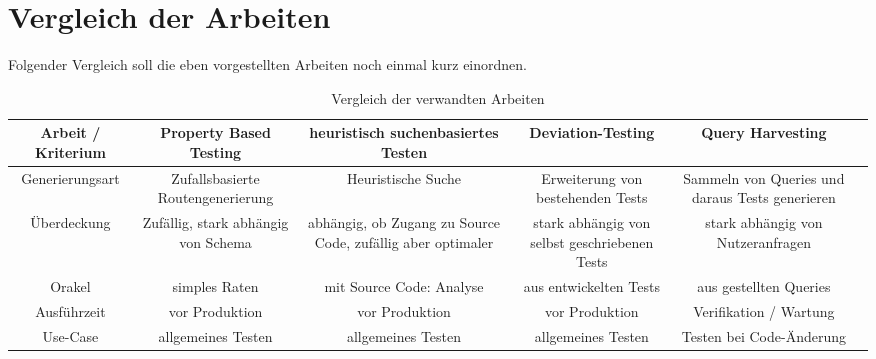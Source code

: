 \section{Vergleich der Arbeiten}
Folgender Vergleich soll die eben vorgestellten Arbeiten noch einmal kurz einordnen.
\begin{center}
    \begin{table}[!hbt]
        \begin{tabularx}{\textwidth}{|C|C|C|C|C|C|}
            \hline
            \textbf{ Arbeit / Kriterium} & \textbf{Property Based Testing} & \textbf{heuristisch suchenbasiertes Testen} & \textbf{Deviation-Testing} & \textbf{Query Harvesting} \\
            \hline
            Generierungsart & Zufallsbasierte Routengenerierung & Heuristische Suche & Erweiterung von bestehenden Tests & Sammeln von Queries und daraus Tests generieren \\
            \hline
            Überdeckung & Zufällig, stark abhängig von Schema  & abhängig, ob Zugang zu Source Code, zufällig aber optimaler & stark abhängig von selbst geschriebenen Tests  & stark abhängig von Nutzeranfragen \\
            \hline
            Orakel & simples Raten & mit Source Code: Analyse & aus entwickelten Tests &  aus gestellten Queries \\
            \hline
            Ausführzeit & vor Produktion & vor Produktion & vor Produktion & Verifikation / Wartung \\
            \hline
            Use-Case & allgemeines Testen & allgemeines Testen & allgemeines Testen & Testen bei Code-Änderung \\
            \hline
        \end{tabularx}
        \caption{Vergleich der verwandten Arbeiten}
    \end{table}
\end{center}



